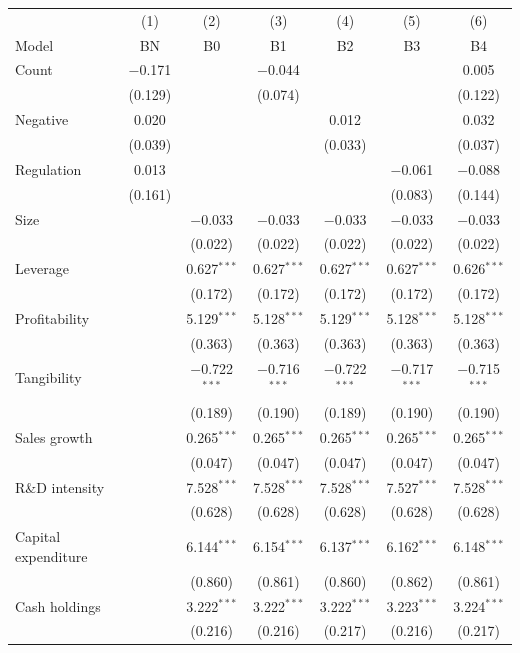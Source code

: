 \begin{tabular}{lcccccc}
\toprule
 & (1) & (2) & (3) & (4) & (5) & (6) \\
Model & BN & B0 & B1 & B2 & B3 & B4 \\
\midrule
Count & $-$0.171 &  & $-$0.044 &  &  & 0.005 \\
 & (0.129) &  & (0.074) &  &  & (0.122) \\
Negative & 0.020 &  &  & 0.012 &  & 0.032 \\
 & (0.039) &  &  & (0.033) &  & (0.037) \\
Regulation & 0.013 &  &  &  & $-$0.061 & $-$0.088 \\
 & (0.161) &  &  &  & (0.083) & (0.144) \\
Size &  & $-$0.033 & $-$0.033 & $-$0.033 & $-$0.033 & $-$0.033 \\
 &  & (0.022) & (0.022) & (0.022) & (0.022) & (0.022) \\
Leverage &  & 0.627$^{***}$ & 0.627$^{***}$ & 0.627$^{***}$ & 0.627$^{***}$ & 0.626$^{***}$ \\
 &  & (0.172) & (0.172) & (0.172) & (0.172) & (0.172) \\
Profitability &  & 5.129$^{***}$ & 5.128$^{***}$ & 5.129$^{***}$ & 5.128$^{***}$ & 5.128$^{***}$ \\
 &  & (0.363) & (0.363) & (0.363) & (0.363) & (0.363) \\
Tangibility &  & $-$0.722$^{***}$ & $-$0.716$^{***}$ & $-$0.722$^{***}$ & $-$0.717$^{***}$ & $-$0.715$^{***}$ \\
 &  & (0.189) & (0.190) & (0.189) & (0.190) & (0.190) \\
Sales growth &  & 0.265$^{***}$ & 0.265$^{***}$ & 0.265$^{***}$ & 0.265$^{***}$ & 0.265$^{***}$ \\
 &  & (0.047) & (0.047) & (0.047) & (0.047) & (0.047) \\
R\&D intensity &  & 7.528$^{***}$ & 7.528$^{***}$ & 7.528$^{***}$ & 7.527$^{***}$ & 7.528$^{***}$ \\
 &  & (0.628) & (0.628) & (0.628) & (0.628) & (0.628) \\
Capital expenditure &  & 6.144$^{***}$ & 6.154$^{***}$ & 6.137$^{***}$ & 6.162$^{***}$ & 6.148$^{***}$ \\
 &  & (0.860) & (0.861) & (0.860) & (0.862) & (0.861) \\
Cash holdings &  & 3.222$^{***}$ & 3.222$^{***}$ & 3.222$^{***}$ & 3.223$^{***}$ & 3.224$^{***}$ \\
 &  & (0.216) & (0.216) & (0.217) & (0.216) & (0.217) \\

\end{tabular}
